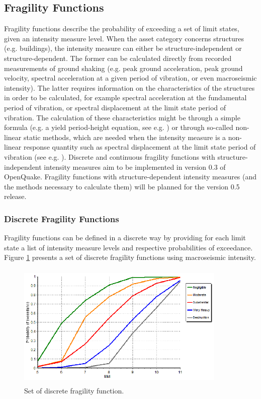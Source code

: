 \subsection{Fragility Functions}
Fragility functions describe the probability of exceeding a set of limit states, given an intensity measure level. When the asset category concerns structures (e.g. buildings), the intensity measure can either be structure-independent or structure-dependent. The former can be calculated directly from recorded measurements of ground shaking (e.g. peak ground acceleration, peak ground velocity, spectral acceleration at a given period of vibration, or even macroseismic intensity). The latter requires information on the characteristics of the structures in order to be calculated, for example spectral acceleration at the fundamental period of vibration, or spectral displacement at the limit state period of vibration. The calculation of these characteristics might be through a simple formula (e.g. a yield period-height equation, see e.g. \citet{CrowleyPinho2004} ) or through so-called non-linear static methods, which are needed when the intensity measure is a non-linear response quantity such as spectral displacement at the limit state period of vibration (see e.g. \citet{FEMA440ATC2005}).
Discrete and continuous fragility functions with structure-independent intensity measures aim to be implemented in version 0.3 of OpenQuake. Fragility functions with structure-dependent intensity measures (and the methods necessary to calculate them) will be planned for the version 0.5 release.

\subsubsection{Discrete Fragility Functions}
Fragility functions can be defined in a discrete way by providing for each limit state a list of intensity measure levels and respective probabilities of exceedance. Figure \ref{fig:FFDiscrete} presents a set of discrete fragility functions using macroseismic intensity.

\begin{figure}[ht]
\centering
\includegraphics[width=10cm,height=6cm]{./Figures/Part_Risk/FFDiscrete.eps}
\caption{Set of discrete fragility function.}
\label{fig:FFDiscrete}
\end{figure}

